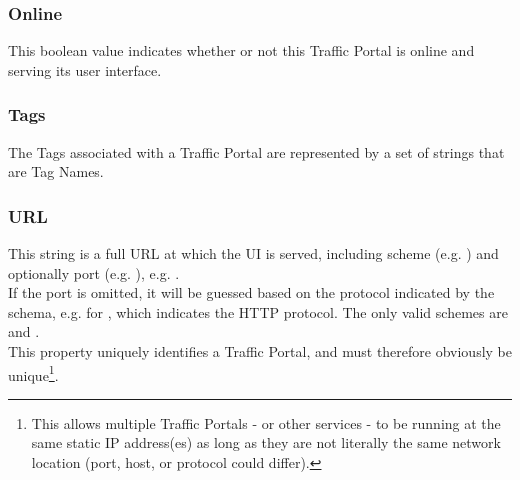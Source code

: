 \subsubsection{Online}
This boolean value indicates whether or not this Traffic Portal is online and
serving its user interface.

\subsubsection{Tags}
The Tags associated with a Traffic Portal are represented by a set of strings
that are Tag Names.

\subsubsection{URL}
This string is a full URL at which the UI is served, including scheme (e.g.
) and optionally port (e.g. ), e.g.
.\\
If the port is omitted, it will be guessed based on the protocol indicated by
the schema, e.g.  for , which indicates the HTTP
protocol. The only valid schemes are  and .\\
This property uniquely identifies a Traffic Portal, and must therefore
obviously be unique\footnote{This allows multiple Traffic Portals - or other
services - to be running at the same static IP address(es) as long as they
are not literally the same network location (port, host, or protocol could
differ).}.
